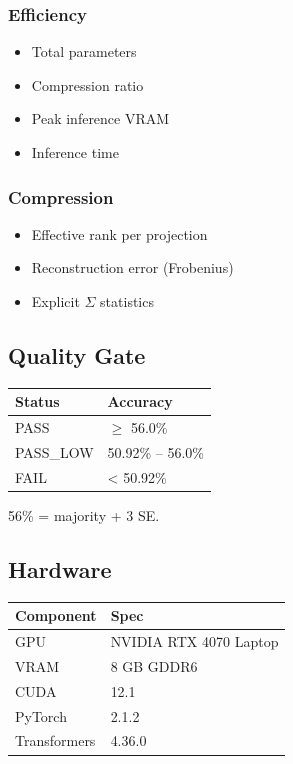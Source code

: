 \subsubsection{Efficiency}

\begin{itemize}
\item Total parameters
\item Compression ratio
\item Peak inference VRAM
\item Inference time

\end{itemize}
\subsubsection{Compression}

\begin{itemize}
\item Effective rank per projection
\item Reconstruction error (Frobenius)
\item Explicit $\Sigma$ statistics

\end{itemize}
\subsection{Quality Gate}

\begin{table}[H]
\centering
\small
\begin{tabular}{ll}
\toprule
\textbf{Status} & \textbf{Accuracy} \\
\midrule
PASS & $\ge$ 56.0\% \\
PASS\_LOW & 50.92\% -- 56.0\% \\
FAIL & \textless{} 50.92\% \\
\bottomrule
\end{tabular}
\end{table}

56\% = majority + 3 SE.

\subsection{Hardware}

\begin{table}[H]
\centering
\small
\begin{tabular}{ll}
\toprule
\textbf{Component} & \textbf{Spec} \\
\midrule
GPU & NVIDIA RTX 4070 Laptop \\
VRAM & 8 GB GDDR6 \\
CUDA & 12.1 \\
PyTorch & 2.1.2 \\
Transformers & 4.36.0 \\
\bottomrule
\end{tabular}
\end{table}

